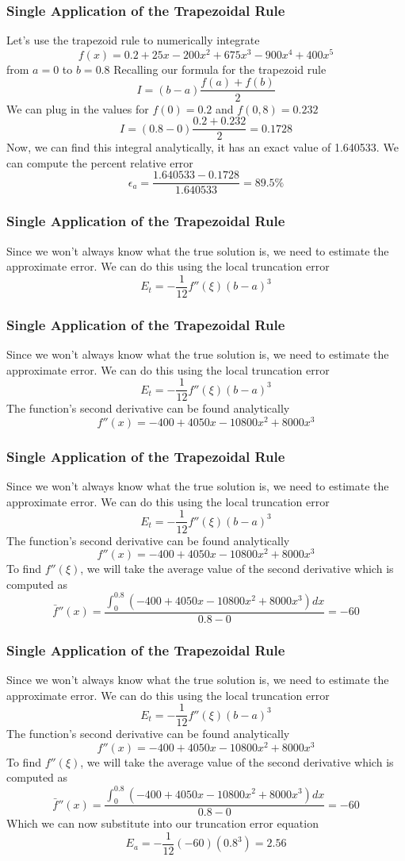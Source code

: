 \documentclass{if-beamer}
\begin{document}
\begin{frame}
	\frametitle{Single Application of the Trapezoidal Rule}
	Let's use the trapezoid rule to numerically integrate
	$$f(x) =0.2+25x-200x^2+675x^3-900x^4+400x^5$$
	from $a = 0$ to $b=0.8$
	Recalling our formula for the trapezoid rule
	$$I = (b-a)\frac{f(a)+f(b)}{2}$$
	We can plug in the values for $f(0) = 0.2$
	and $f(0,8) = 0.232$
	$$I = (0.8-0)\frac{0.2+0.232}{2} = 0.1728$$
	Now, we can find this integral analytically, it has an exact value of 1.640533. We can compute the percent relative error
	$$\epsilon_a = \frac{1.640533-0.1728}{1.640533} = 89.5\%$$ 
\end{frame}

\begin{frame}
	\frametitle{Single Application of the Trapezoidal Rule}
	Since we won't always know what the true solution is, we need to estimate the approximate error. We can do this using the local truncation error
	$$E_t =-\frac{1}{12}f''(\xi)(b-a)^3$$
\end{frame}

\begin{frame}
	\frametitle{Single Application of the Trapezoidal Rule}
	Since we won't always know what the true solution is, we need to estimate the approximate error. We can do this using the local truncation error
	$$E_t =-\frac{1}{12}f''(\xi)(b-a)^3$$
	The function's second derivative can be found analytically
	$$f''(x) = -400+4050x-10800x^2+8000x^3$$
\end{frame}

\begin{frame}
	\frametitle{Single Application of the Trapezoidal Rule}
	Since we won't always know what the true solution is, we need to estimate the approximate error. We can do this using the local truncation error
	$$E_t =-\frac{1}{12}f''(\xi)(b-a)^3$$
	The function's second derivative can be found analytically
	$$f''(x) = -400+4050x-10800x^2+8000x^3$$
	To find $f''(\xi)$, we will take the average value of the second derivative which is computed as
	$$ \bar{f}''(x) = \frac{\int_{0}^{0.8}(-400+4050x-10800x^2+8000x^3)dx}{0.8-0} = -60$$
	
\end{frame}

\begin{frame}
	\frametitle{Single Application of the Trapezoidal Rule}
	Since we won't always know what the true solution is, we need to estimate the approximate error. We can do this using the local truncation error
	$$E_t =-\frac{1}{12}f''(\xi)(b-a)^3$$
	The function's second derivative can be found analytically
	$$f''(x) = -400+4050x-10800x^2+8000x^3$$
	To find $f''(\xi)$, we will take the average value of the second derivative which is computed as
	$$ \bar{f}''(x) = \frac{\int_{0}^{0.8}(-400+4050x-10800x^2+8000x^3)dx}{0.8-0} = -60$$
	Which we can now substitute into our truncation error equation
	$$E_a = -\frac{1}{12}(-60)(0.8^3) = 2.56$$
	
\end{frame}
\end{document}
